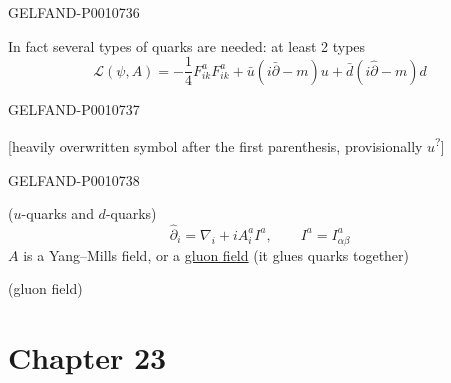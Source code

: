 \begin{GelfandAdjacentEvidence}{GELFAND-P001073}{6}


In fact several types of quarks are needed: at least 2 types
\begin{equation*}
\mathcal L(\psi,A)=-\frac14F_{ik}^aF_{ik}^a+\bar u(i\bar\partial-m)u+\bar d(i\hat\partial-m)d
\tag{25}
\end{equation*}
\end{GelfandAdjacentEvidence}
\begin{GelfandAdjacentEvidence}{GELFAND-P001073}{7}

[heavily overwritten symbol after the first parenthesis, provisionally \(u\)\textsuperscript{?}]
\end{GelfandAdjacentEvidence}
\begin{GelfandAdjacentEvidence}{GELFAND-P001073}{8}


($u$-quarks and $d$-quarks)
\begin{equation*}
\hat\partial_i=\nabla_i+iA_i^a I^a,\qquad I^a=I^a_{\alpha\beta}
\tag{26}
\end{equation*}
$A$ is a Yang–Mills field, or a \uline{gluon field} (it glues quarks together)

(gluon field)
\end{GelfandAdjacentEvidence}



\clearpage{}
\section*{Chapter 23}


